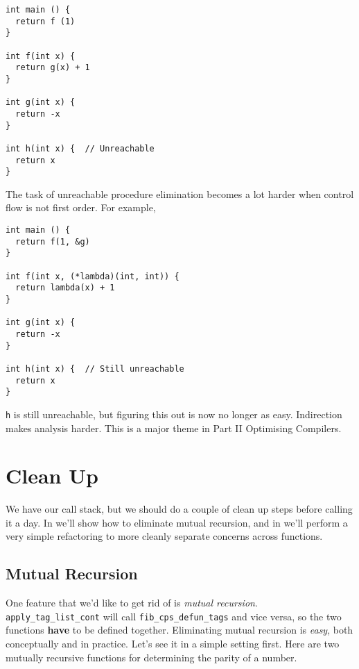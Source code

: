 \begin{code}
\label{code:unreachable-c}
\begin{verbatim}
int main () {
  return f (1)
}

int f(int x) {
  return g(x) + 1
}

int g(int x) {
  return -x
}

int h(int x) {  // Unreachable
  return x
}
\end{verbatim}
\end{code}

The task of unreachable procedure elimination becomes a lot harder when control flow is not first order. For example,

\begin{code}
\label{code:unreachable-indirection-c}
\begin{verbatim}
int main () {
  return f(1, &g)
}

int f(int x, (*lambda)(int, int)) {
  return lambda(x) + 1
}

int g(int x) {
  return -x
}

int h(int x) {  // Still unreachable
  return x
}
\end{verbatim}
\end{code}

\texttt{h} is still unreachable, but figuring this out is now no longer as easy. Indirection makes analysis harder. This is a major theme in {\sffamily Part II Optimising Compilers}.

\section{Clean Up}\label{section:clean-up}
We have our call stack, but we should do a couple of clean up steps before calling it a day. In  we'll show how to eliminate mutual recursion, and in  we'll perform a very simple refactoring to more cleanly separate concerns across functions.

\subsection{Mutual Recursion}\label{subsection:mutrec}
One feature that we'd like to get rid of is \emph{mutual recursion}. \texttt{apply\_tag\_list\_cont} will call \texttt{fib\_cps\_defun\_tags} and vice versa, so the two functions \textbf{have} to be defined together. Eliminating mutual recursion is \emph{easy}, both conceptually and in practice. Let's see it in a simple setting first. Here are two mutually recursive functions for determining the parity of a number.

